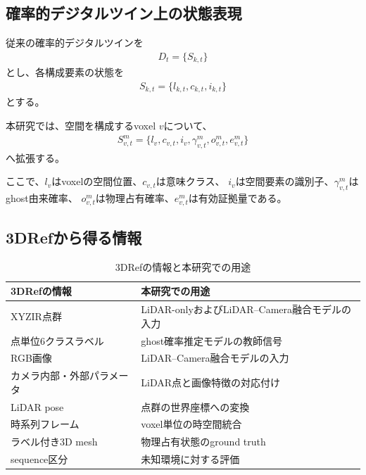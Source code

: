 \documentclass[uplatex,a4paper,11pt]{jsarticle}
\begin{document}
\subsection{確率的デジタルツイン上の状態表現}

従来の確率的デジタルツインを
\begin{align}
  D_t
  =
  \{
    S_{k,t}
  \}
\end{align}
とし、各構成要素の状態を
\begin{align}
  S_{k,t}
  =
  \{
    l_{k,t},
    c_{k,t},
    i_{k,t}
  \}
\end{align}
とする。

本研究では、空間を構成するvoxel $v$について、
\begin{align}
  S_{v,t}^{m}
  =
  \{
    l_v,
    c_{v,t},
    i_v,
    \gamma_{v,t}^{m},
    o_{v,t}^{m},
    e_{v,t}^{m}
  \}
\end{align}
へ拡張する。

ここで、$l_v$はvoxelの空間位置、$c_{v,t}$は意味クラス、
$i_v$は空間要素の識別子、$\gamma_{v,t}^{m}$はghost由来確率、
$o_{v,t}^{m}$は物理占有確率、$e_{v,t}^{m}$は有効証拠量である。

\subsection{3DRefから得る情報}

\begin{table}[h]
  \centering
  \caption{3DRefの情報と本研究での用途}
  \begin{tabular}{ll}
    \toprule
    3DRefの情報 & 本研究での用途 \\
    \midrule
    XYZIR点群
      & LiDAR-onlyおよびLiDAR--Camera融合モデルの入力 \\
    点単位6クラスラベル
      & ghost確率推定モデルの教師信号 \\
    RGB画像
      & LiDAR--Camera融合モデルの入力 \\
    カメラ内部・外部パラメータ
      & LiDAR点と画像特徴の対応付け \\
    LiDAR pose
      & 点群の世界座標への変換 \\
    時系列フレーム
      & voxel単位の時空間統合 \\
    ラベル付き3D mesh
      & 物理占有状態のground truth \\
    sequence区分
      & 未知環境に対する評価 \\
    \bottomrule
  \end{tabular}
\end{table}
\end{document}
